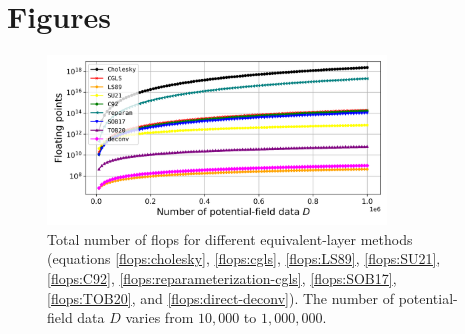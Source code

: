 





%





\section{Figures}

\begin{figure}[htbp]
\begin{center}
\includegraphics[width=9cm]{Fig/flops}
\end{center}
\caption{
	Total number of flops for different equivalent-layer methods
	(equations \ref{flops:cholesky}, \ref{flops:cgls}, \ref{flops:LS89}, \ref{flops:SU21}, 
	\ref{flops:C92}, \ref{flops:reparameterization-cgls}, \ref{flops:SOB17}, \ref{flops:TOB20},
	and \ref{flops:direct-deconv}). 
	The number of potential-field data $D$ varies from $10,000$ to $1,000,000$.
	}
\label{fig:flops}
\end{figure}

